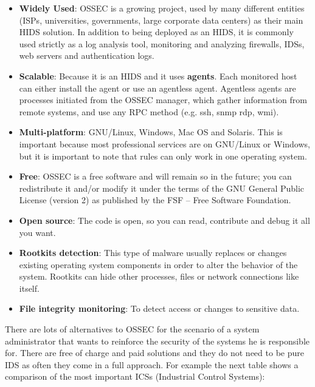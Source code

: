 \begin{itemize}
	\item \textbf{Widely Used}: OSSEC is a growing project, used by many different entities (ISPs, universities, governments, large corporate data centers) as their main HIDS solution. In addition to being deployed as an HIDS, it is commonly used strictly as a log analysis tool, monitoring and analyzing firewalls, IDSs, web servers and authentication logs.
	\item \textbf{Scalable}: Because it is an HIDS and it uses \textbf{agents}. Each monitored host can either install the agent or use an agentless agent\cite{agentless}\cite{ossec_agent}. Agentless agents are processes initiated from the OSSEC manager, which gather information from remote systems, and use any RPC method (e.g. ssh, snmp rdp, wmi).
	\item \textbf{Multi-platform}: GNU/Linux, Windows, Mac OS and Solaris. This is important because most professional services are on GNU/Linux or Windows, but it is important to note that rules can only work in one operating system.
	\item \textbf{Free}: OSSEC is a free software and will remain so in the future; you can redistribute it and/or modify it under the terms of the GNU General Public License (version 2) as published by the FSF -- Free Software Foundation.
	\item \textbf{Open source}: The code is open, so you can read, contribute and debug it all you want.
	\item \textbf{Rootkits detection}: This type of malware usually replaces or changes existing operating system components in order to alter the behavior of the system. Rootkits can hide other processes, files or network connections like itself.
	\item \textbf{File integrity monitoring}: To detect access or changes to sensitive data.
\end{itemize}
\linej
There are lots of alternatives to OSSEC for the scenario of a system administrator that wants to reinforce the security of the systems he is responsible for. There are free of charge and paid solutions and they do not need to be pure IDS as often they come in a full approach. For example the next table shows a comparison of the most important ICSs (Industrial Control Systems):
